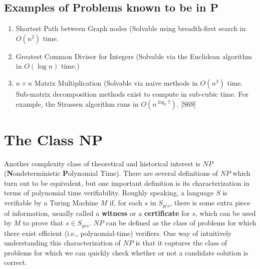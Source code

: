 \documentclass{article}
\renewcommand{\cite}[1]{[#1]}
\renewcommand{\cite}[1]{[#1]}
\begin{document}
\subsection*{Examples of Problems known to be in P}

\begin{enumerate}
\item{Shortest Path between Graph nodes (Solvable using
    breadth-first search in $O(n^2)$ time.}
\item{Greatest Common Divisor for Integers (Solvable via the Euclidean
    algorithm in $O(\log{n})$ time.)}
  
\item $n \times n$ Matrix Multiplication (Solvable via naive methods
  in $O(n^3)$ time.  Sub-matrix decomposition methods exist to
  compute in sub-cubic time.  For example, the Strassen algorithm
  runs in $O(n^{\log_2 7})$. \cite{S69}
    
\end{enumerate}

\section{The Class NP}

Another complexity class of theoretical and historical interest is
$NP$ (\textbf{N}ondeterministic \textbf{P}olynomial Time).  There
are several definitions of $NP$ which turn out to be equivalent, but
one important definition is its characterization in terms of
polynomial time verifiability.  Roughly speaking, a language $S$ is
verifiable by a Turing Machine $M$ if, for each $s$ in $S_{yes}$,
there is some extra piece of information, usually called a
\textbf{witness} or a \textbf{certificate} for $s$, which can be
used by $M$ to prove that $s \in S_{yes}$. $NP$ can be defined as
the class of problems for which there exist efficient (i.e.,
polynomial-time) verifiers. One way of intuitively understanding this
characterization of $NP$ is that it captures the class of problems
for which we can quickly check whether or not a candidate solution
is correct.
\end{document}
